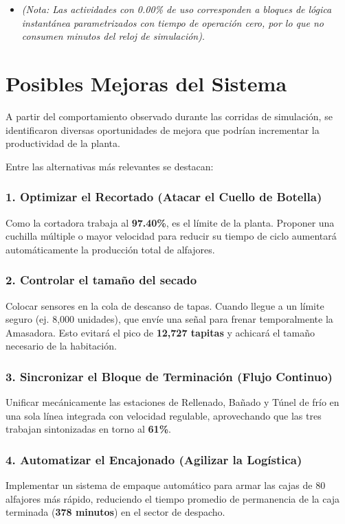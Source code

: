 \documentclass[runningheads]{llncs}
\begin{document}
\begin{itemize}
    \item \textit{(Nota: Las actividades con 0.00\% de uso corresponden a bloques de lógica instantánea parametrizados con tiempo de operación cero, por lo que no consumen minutos del reloj de simulación)}.
\end{itemize}
 

\section{Posibles Mejoras del Sistema}

A partir del comportamiento observado durante las corridas de simulación, se identificaron diversas oportunidades de mejora que podrían incrementar la productividad de la planta.

Entre las alternativas más relevantes se destacan:

\begin{itemize}

\subsubsection{1. Optimizar el Recortado (Atacar el Cuello de Botella)}

Como la cortadora trabaja al \textbf{97.40\%}, es el límite de la planta. Proponer una cuchilla múltiple o mayor velocidad para reducir su tiempo de ciclo aumentará automáticamente la producción total de alfajores.

\subsubsection{2. Controlar el tamaño del secado}

Colocar sensores en la cola de descanso de tapas. Cuando llegue a un límite seguro (ej. 8,000 unidades), que envíe una señal para frenar temporalmente la Amasadora. Esto evitará el pico de \textbf{12,727 tapitas} y achicará el tamaño necesario de la habitación.

\subsubsection{3. Sincronizar el Bloque de Terminación (Flujo Continuo)}

Unificar mecánicamente las estaciones de Rellenado, Bañado y Túnel de frío en una sola línea integrada con velocidad regulable, aprovechando que las tres trabajan sintonizadas en torno al \textbf{61\%}.

\subsubsection{4. Automatizar el Encajonado (Agilizar la Logística)}

Implementar un sistema de empaque automático para armar las cajas de 80 alfajores más rápido, reduciendo el tiempo promedio de permanencia de la caja terminada (\textbf{378 minutos}) en el sector de despacho.

 
\end{itemize}
\end{document}
